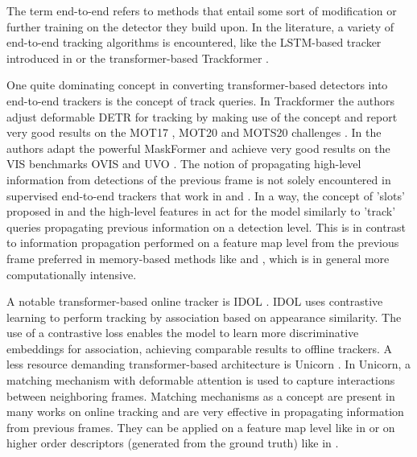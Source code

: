  The term end-to-end refers to methods that entail some sort of modification or further training on the detector they build upon.
In the literature, a variety of end-to-end tracking algorithms is encountered, like the LSTM-based tracker introduced in \parencite{gordon2017re3} or the transformer-based Trackformer \parencite{meinhardt2021trackformer}.\par
One quite dominating concept in converting transformer-based detectors into end-to-end trackers is the concept of track queries. In Trackformer \parencite{meinhardt2021trackformer} the authors adjust deformable DETR \parencite{zhu2020deformable} for tracking by making use of the concept and report very good results on the MOT17 \parencite{mot17}, MOT20 \parencite{mot20} and MOTS20 challenges \parencite{mots20}. 
In \parencite{Rovis} the authors adapt the powerful MaskFormer \parencite{cheng2021maskformer} and achieve very good results on the VIS benchmarks OVIS \parencite{ovis} and UVO \parencite{uvo}. 
The notion of propagating high-level information from detections of the previous frame is not solely encountered in supervised end-to-end trackers that work in \parencite{meinhardt2021trackformer} and \parencite{Rovis}. 
In a way, the concept of 'slots' proposed in \parencite{savi} and the high-level features in \parencite{athar2022hodor} act for the model similarly to 'track' queries propagating previous information on a detection level. 
This is in contrast to information propagation performed on a feature map level from the previous frame preferred in memory-based methods like \parencite{stm} and \parencite{yang2021aot}, which is in general more computationally intensive. \par

A notable transformer-based online tracker is IDOL \parencite{IDOL}. IDOL uses contrastive learning to perform tracking by association based on appearance similarity. 
The use of a contrastive loss enables the model to learn more discriminative embeddings for association, achieving comparable results to offline trackers.
A less resource demanding transformer-based architecture is Unicorn \parencite{unicorn}. 
In Unicorn, a matching mechanism with deformable attention is used to capture interactions between neighboring frames. Matching mechanisms as a concept are present in many works on online tracking and are very effective in propagating information from previous frames. They can be applied on a feature map level like in \parencite{stm} or on higher order descriptors (generated from the ground truth) like in \parencite{athar2022hodor}.\par

